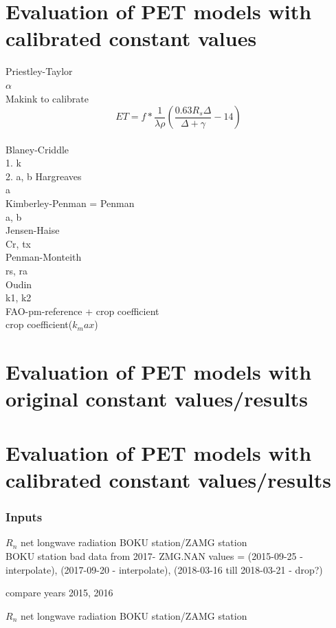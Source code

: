 \documentclass[hydrology,article,submit,moreauthors,pdftex]{Definitions/mdpi}
\begin{document}
\section{Evaluation of PET models with calibrated constant values}

Priestley-Taylor \\
$\alpha$
\\
Makink to calibrate \cite{asce2005asce}
\begin{equation}
ET = f * \frac{1}{\lambda \rho} \left(\frac{0.63 R_s \Delta}{\Delta+\gamma}-14 \right)
\end{equation}
\\
Blaney-Criddle \\
1. k \\
2. a, b 
Hargreaves \\
a \\
Kimberley-Penman = Penman \\
a, b \\
Jensen-Haise \\
Cr, tx \\
Penman-Monteith \\
rs, ra \\
Oudin \\
k1, k2 \\
FAO-pm-reference + crop coefficient \\
crop coefficient($k_max$) 
\section{Evaluation of PET models with original constant values/results}
\section{Evaluation of PET models with calibrated constant values/results}


\subsubsection{Inputs}

$R_n$ net longwave radiation
BOKU station/ZAMG station \\

BOKU station bad data from 2017-
ZMG.NAN values = (2015-09-25 - interpolate), (2017-09-20 - interpolate), (2018-03-16 till 2018-03-21 - drop?)

compare years 2015, 2016

$R_n$ net longwave radiation
BOKU station/ZAMG station \\
\end{document}
